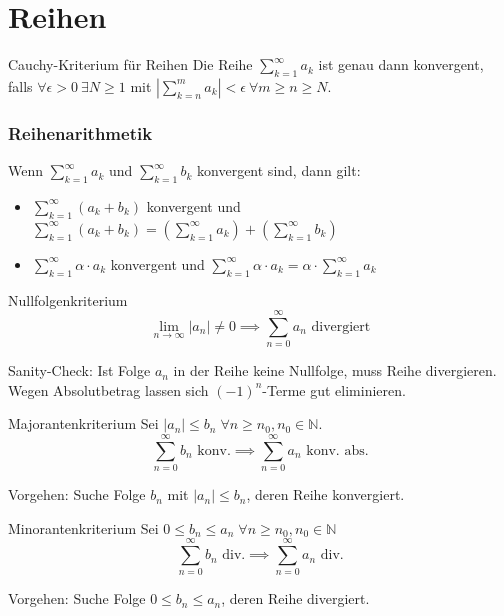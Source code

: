 \documentclass[a4paper,10pt]{article}
\def\limn{\lim_{n\to \infty}}
\def\sumk{\sum_{k=1}^\infty}
\def\sumn{\sum_{n=0}^\infty}
\def\N{\mathbb{N}}
\begin{document}
\section{Reihen}

\begin{mainbox}{Cauchy-Kriterium für Reihen}
Die Reihe $\sumk a_k$ ist genau dann konvergent, falls $\forall \epsilon > 0 \ \exists N \ge 1$ mit $| \sum_{k=n}^m a_k | < \epsilon \ \forall m \ge n \ge N$.
\end{mainbox}

\subsubsection{Reihenarithmetik}
Wenn $\sumk a_k$ und $\sumk b_k$ konvergent sind, dann gilt:
\begin{itemize}
 \item $\sumk (a_k + b_k)$ konvergent und $\sumk (a_k + b_k) = \left( \sumk a_k \right) + \left( \sumk b_k \right)$
 \item $\sumk \alpha \cdot a_k$ konvergent und $\sumk \alpha \cdot a_k = \alpha \cdot \sumk a_k$
\end{itemize}


\begin{mainbox}{Nullfolgenkriterium}
\[ \limn \left| a_n \right| \neq 0 \implies \sumn{a_n} \text{ divergiert} \]
\end{mainbox}
Sanity-Check: Ist Folge $a_n$ in der Reihe keine Nullfolge, muss Reihe divergieren. Wegen Absolutbetrag lassen sich $(-1)^n$-Terme gut eliminieren.

\begin{mainbox}{Majorantenkriterium}
Sei $\left| a_n \right| \leq b_n \; \forall n \geq n_0, n_0 \in \N$.
\[ \sumn{b_n} \text{ konv.} \implies \sumn{a_n} \text{ konv. abs.} \]
\end{mainbox}
Vorgehen: Suche Folge $b_n$ mit $\left| a_n \right| \leq b_n$, deren Reihe konvergiert.

\begin{mainbox}{Minorantenkriterium}
Sei $0 \leq b_n \leq a_n \; \forall n \geq n_0, n_0 \in \N$
\[ \sumn{b_n} \text{ div.} \implies \sumn{a_n} \text{ div.} \]
\end{mainbox}
Vorgehen: Suche Folge $0 \leq b_n \leq a_n$, deren Reihe divergiert.
\end{document}
